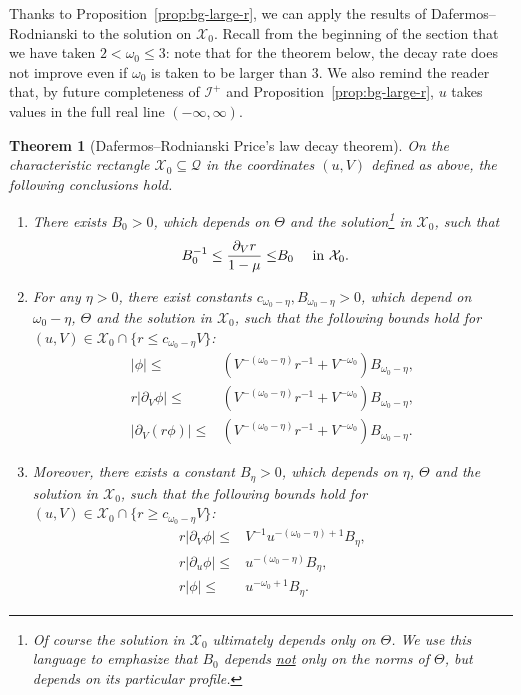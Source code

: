 \documentclass[10pt, reqno]{amsart}
\newtheorem{theorem}{Theorem}[section]
\theoremstyle{definition}
\theoremstyle{remark}
\theoremstyle{conjecture}
\numberwithin{equation}{section}
\newcommand{\abs}[1]{\vert#1\vert}
\newcommand{\set}[1]{\{#1\}}
\newcommand{\rd}{\partial}
\newcommand{\0}{\emptyset}
\newcommand{\Tht}{\Theta}
\newcommand{\omg}{\omega}
\newcommand{\calI}{\mathcal I}
\newcommand{\calQ}{\mathcal Q}
\newcommand{\calX}{\mathcal X}
\newcommand{\PD}{\calQ}
\newcommand{\NI}{\calI^{+}}						%
\begin{document}
Thanks to Proposition~\ref{prop:bg-large-r}, we can apply the results of Dafermos--Rodnianski \cite{DRPL} to the solution on $\calX_{0}$. Recall from the beginning of the section that we have taken $2<\omg_0\leq 3$: note that for the theorem below, the decay rate does not improve even if $\omg_0$ is taken to be larger than $3$. We also remind the reader that, by future completeness of $\NI$ and Proposition~\ref{prop:bg-large-r}, $u$ takes values in the full real line $(-\infty, \infty)$.
\begin{theorem}[Dafermos--Rodnianski Price's law decay theorem] \label{thm:DR-full}
On the characteristic rectangle $\calX_{0} \subseteq \PD$  in the coordinates $(u, V)$ defined as above, the following conclusions hold.
\begin{enumerate}
\item There exists $B_{0} > 0$, which depends on $\Tht$ and the solution\footnote{Of course the solution in $\calX_{0}$ ultimately depends only on $\Tht$. We use this language to emphasize that $B_{0}$ depends \underline{not} only on the norms of $\Tht$, but depends on its particular profile.} in $\calX_{0}$, such that
\begin{align} 
	B_{0}^{-1} \leq \frac{\rd_{V} r}{1-\mu}  \leq & B_{0} \quad \hbox{ in } \calX_{0}. \label{eq:DR:kpp}
\end{align}
\item For any $\eta > 0$, there exist constants $c_{\omg_{0} - \eta}, B_{\omg_{0} - \eta} > 0$, which depend on $\omg_{0} - \eta$, $\Tht$ and the solution in $\calX_{0}$, such that the following bounds hold for $(u, V) \in \calX_{0} \cap \set{r \leq c_{\omg_{0} - \eta} V}$: 
\begin{align}
	\abs{\phi} \leq & \left( V^{-(\omg_{0} - \eta)} r^{-1} + V^{-\omg_{0}} \right) B_{\omg_{0} - \eta}  , \label{eq:DR:phi-med-r} \\
	r \abs{\rd_{V} \phi} \leq & \left( V^{-(\omg_{0} - \eta)} r^{-1} + V^{-\omg_{0}} \right) B_{\omg_{0} - \eta}, \label{eq:DR:dvphi-med-r}\\
	\abs{\rd_{V} (r \phi)} \leq & \left( V^{-(\omg_{0} - \eta)} r^{-1} + V^{-\omg_{0}} \right) B_{\omg_{0} - \eta}. \label{eq:DR:dvrphi-med-r}
\end{align}
\item Moreover, there exists a constant $B_{\eta} > 0$, which depends on $\eta$, $\Tht$ and the solution in $\calX_{0}$, such that the following bounds hold for $(u, V) \in \calX_{0} \cap \set{r \geq c_{\omg_{0} - \eta} V}$:
\begin{align}
	r \abs{\rd_{V} \phi} \leq &  V^{-1} u^{-(\omg_{0} - \eta) + 1} B_{\eta}, 	\label{eq:DR:dvphi-huge-r} \\
	r \abs{\rd_{u} \phi} \leq & u^{-(\omg_{0} - \eta)} B_{\eta} ,		\label{eq:DR:duphi-huge-r} \\
	r \abs{\phi} \leq & u^{-\omg_{0} + 1} B_{\eta}.				\label{eq:DR:phi-huge-r}
\end{align}
\end{enumerate}
\end{theorem}
\end{document}
